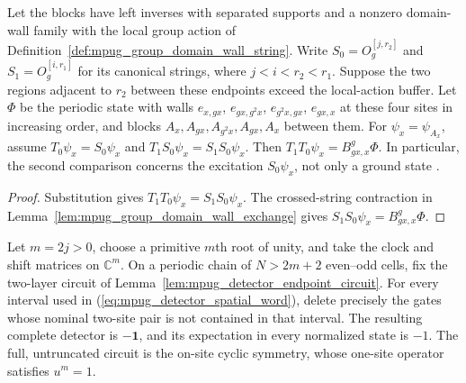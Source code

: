 \begin{lemma}
    \label{lem:mpug_detector_first_canonical_crossing}
    \leanok
    Let the blocks have left inverses with separated supports and a
    nonzero domain-wall family with the local group action of
    Definition~\ref{def:mpug_group_domain_wall_string}.
    Write $S_0=O_g^{[j,r_2]}$ and $S_1=O_g^{[i,r_1]}$ for its canonical
    strings, where $j<i<r_2<r_1$. Suppose the two regions adjacent to
    $r_2$ between these endpoints exceed the local-action buffer. Let
    $\Phi$ be the periodic state with walls $e_{x,gx}$, $e_{gx,g^2x}$,
    $e_{g^2x,gx}$, $e_{gx,x}$ at these four sites in increasing order,
    and blocks $A_x,A_{gx},A_{g^2x},A_{gx},A_x$ between them.
    For $\psi_x=\psi_{A_x}$, assume
    $T_0\psi_x=S_0\psi_x$ and $T_1S_0\psi_x=S_1S_0\psi_x$.
    Then $T_1T_0\psi_x=B^g_{gx,x}\Phi$.
    In particular, the second comparison concerns the excitation
    $S_0\psi_x$, not only a ground state
    \cite{gap:gs24_truncation_detector_endpoint_dependence}.
\end{lemma}

\begin{proof}\leanok
    Substitution gives $T_1T_0\psi_x=S_1S_0\psi_x$.
    The crossed-string contraction in
    Lemma~\ref{lem:mpug_group_domain_wall_exchange} gives
    $S_1S_0\psi_x=B^g_{gx,x}\Phi$.
\end{proof}

\begin{lemma}
    \label{lem:mpug_detector_complete_circuit}
    \leanok
    Let $m=2j>0$, choose a primitive $m$th root of unity, and take the
    clock and shift matrices on $\mathbb C^m$. On a periodic chain of
    $N>2m+2$ even--odd cells, fix the two-layer circuit of
    Lemma~\ref{lem:mpug_detector_endpoint_circuit}. For every interval
    used in (\ref{eq:mpug_detector_spatial_word}), delete precisely the
    gates whose nominal two-site pair is not contained in that interval.
    The resulting complete detector is $-\mathbf 1$, and its expectation
    in every normalized state is $-1$. The full, untruncated circuit is
    the on-site cyclic symmetry, whose one-site operator satisfies $u^m=1$.
\end{lemma}

